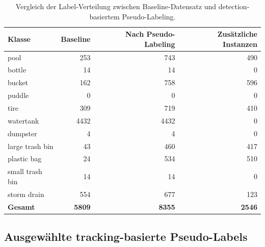 \begin{table}[H]
    \centering
    \caption{Vergleich der Label-Verteilung zwischen Baseline-Datensatz und
        detection-basiertem Pseudo-Labeling.}
    \label{tab:anhang_pseudo_distribution}
    \begin{tabular}{lrrr}
        \toprule
        \textbf{Klasse} & \textbf{Baseline} & \textbf{Nach Pseudo-Labeling} &
        \textbf{Zusätzliche Instanzen}                                                      \\
        \midrule
        pool            & 253               & 743                           & 490           \\
        bottle          & 14                & 14                            & 0             \\
        bucket          & 162               & 758                           & 596           \\
        puddle          & 0                 & 0                             & 0             \\
        tire            & 309               & 719                           & 410           \\
        watertank       & 4432              & 4432                          & 0             \\
        dumpster        & 4                 & 4                             & 0             \\
        large trash bin & 43                & 460                           & 417           \\
        plastic bag     & 24                & 534                           & 510           \\
        small trash bin & 14                & 14                            & 0             \\
        storm drain     & 554               & 677                           & 123           \\
        \midrule
        \textbf{Gesamt} & \textbf{5809}     & \textbf{8355}                 & \textbf{2546} \\
        \bottomrule
    \end{tabular}
\end{table}

\subsection{Ausgewählte tracking-basierte Pseudo-Labels}

